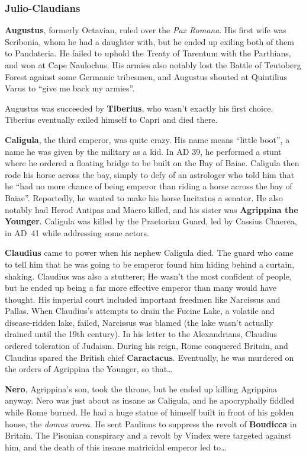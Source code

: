 \subsubsection*{Julio-Claudians}

\textbf{Augustus}, formerly Octavian, ruled over the \textit{Pax Romana}.
His first wife was Scribonia, whom he had a daughter with, but he ended up exiling both of them to Pandateria.
He failed to uphold the Treaty of Tarentum with the Parthians, and won at Cape Naulochus.
His armies also notably lost the Battle of Teutoberg Forest against some Germanic tribesmen,
and Augustus shouted at Quintilius Varus to ``give me back my armies''.

Augustus was succeeded by \textbf{Tiberius}, who wasn't exactly his first choice.
Tiberius eventually exiled himself to Capri and died there.

\textbf{Caligula}, the third emperor, was quite crazy.
His name means ``little boot'', a name he was given by the military as a kid.
In AD 39, he performed a stunt where he ordered a floating bridge to be built on the Bay of Baiae.
Caligula then rode his horse across the bay, simply to defy of an astrologer who told him that he
``had no more chance of being emperor than riding a horse across the bay of Baiae''.
Reportedly, he wanted to make his horse Incitatus a senator.
He also notably had Herod Antipas and Macro killed,
and his sister was \textbf{Agrippina the Younger}.
Caligula was killed by the Praetorian Guard, led by Cassius Chaerea, in AD~41 while addressing some actors.

\textbf{Claudius} came to power when his nephew Caligula died.
The guard who came to tell him that he was going to be emperor found him hiding behind a curtain, shaking.
Claudius was also a stutterer;
He wasn't the most confident of people,
but he ended up being a far more effective emperor than many would have thought.
His imperial court included important freedmen like Narcissus and Pallas.
When Claudius's attempts to drain the Fucine Lake, a volatile and disease-ridden lake, failed,
Narcissus was blamed (the lake wasn't actually drained until the 19th century).
In his letter to the Alexandrians, Claudius ordered toleration of Judaism.
During his reign, Rome conquered Britain, and Claudius spared the British chief \textbf{Caractacus}.
Eventually, he was murdered on the orders of Agrippina the Younger, so that\ldots{}

\textbf{Nero}, Agrippina's son, took the throne, but he ended up killing Agrippina anyway.
Nero was just about as insane as Caligula, and he apocryphally fiddled while Rome burned.
He had a huge statue of himself built in front of his golden house, the \textit{domus aurea}.
He sent Paulinus to suppress the revolt of \textbf{Boudicca} in Britain.
The Pisonian conspiracy and a revolt by Vindex were targeted against him,
and the death of this insane matricidal emperor led to\ldots{}

